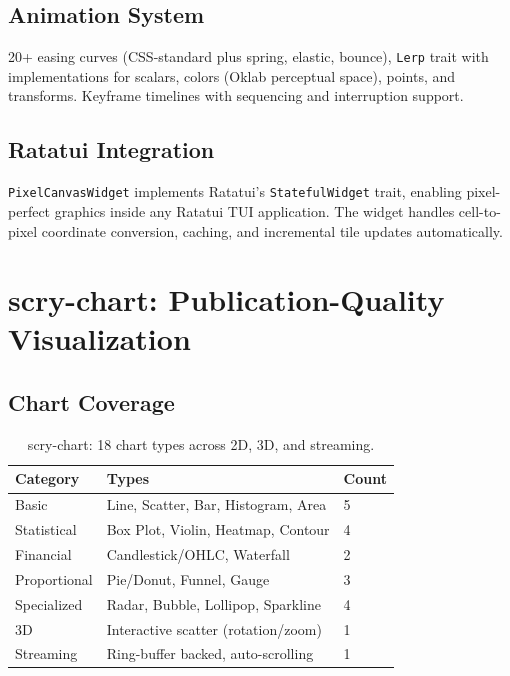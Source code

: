 \documentclass[11pt,a4paper]{article}
\begin{document}
\subsection{Animation System}

20+ easing curves (CSS-standard plus spring, elastic, bounce),
\texttt{Lerp} trait with implementations for scalars, colors (Oklab
perceptual space), points, and transforms. Keyframe timelines with
sequencing and interruption support.

\subsection{Ratatui Integration}

\texttt{PixelCanvasWidget} implements Ratatui's \texttt{StatefulWidget}
trait, enabling pixel-perfect graphics inside any Ratatui TUI
application. The widget handles cell-to-pixel coordinate conversion,
caching, and incremental tile updates automatically.

\section{scry-chart: Publication-Quality Visualization}

\subsection{Chart Coverage}

\begin{table}[H]
\centering
\caption{scry-chart: 18 chart types across 2D, 3D, and streaming.}
\small
\begin{tabular}{lll}
\toprule
\textbf{Category} & \textbf{Types} & \textbf{Count} \\
\midrule
Basic & Line, Scatter, Bar, Histogram, Area & 5 \\
Statistical & Box Plot, Violin, Heatmap, Contour & 4 \\
Financial & Candlestick/OHLC, Waterfall & 2 \\
Proportional & Pie/Donut, Funnel, Gauge & 3 \\
Specialized & Radar, Bubble, Lollipop, Sparkline & 4 \\
\midrule
3D & Interactive scatter (rotation/zoom) & 1 \\
Streaming & Ring-buffer backed, auto-scrolling & 1 \\
\bottomrule
\end{tabular}
\end{table}
\end{document}
